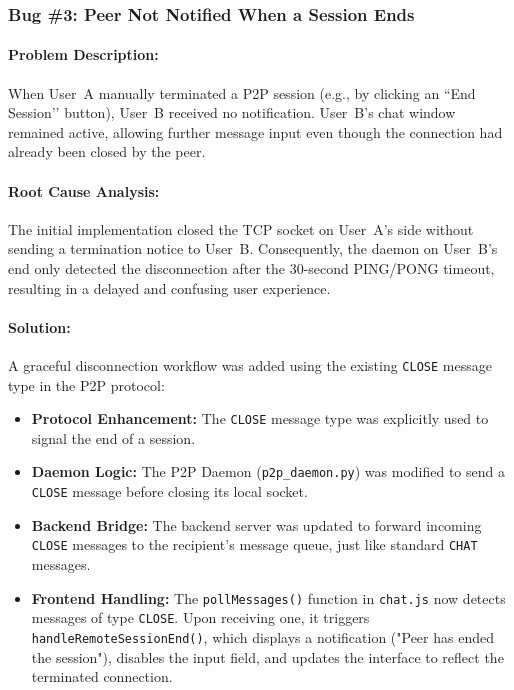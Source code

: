 \subsubsection{Bug \#3: Peer Not Notified When a Session Ends}

\paragraph{Problem Description:}
When User~A manually terminated a P2P session (e.g., by clicking an ``End Session’’ button), 
User~B received no notification. 
User~B’s chat window remained active, allowing further message input even though the connection had already been closed by the peer.

\paragraph{Root Cause Analysis:}
The initial implementation closed the TCP socket on User~A’s side without sending a termination notice to User~B. 
Consequently, the daemon on User~B’s end only detected the disconnection after the 30-second PING/PONG timeout, 
resulting in a delayed and confusing user experience.

\paragraph{Solution:}
A graceful disconnection workflow was added using the existing \texttt{CLOSE} message type in the P2P protocol:
\begin{itemize}
    \item \textbf{Protocol Enhancement:} The \texttt{CLOSE} message type was explicitly used to signal the end of a session.
    \item \textbf{Daemon Logic:} The P2P Daemon (\texttt{p2p\_daemon.py}) was modified to send a \texttt{CLOSE} message before closing its local socket.
    \item \textbf{Backend Bridge:} The backend server was updated to forward incoming \texttt{CLOSE} messages to the recipient’s message queue, just like standard \texttt{CHAT} messages.
    \item \textbf{Frontend Handling:} The \texttt{pollMessages()} function in \texttt{chat.js} now detects messages of type \texttt{CLOSE}. 
    Upon receiving one, it triggers \texttt{handleRemoteSessionEnd()}, which displays a notification ("Peer has ended the session"), disables the input field, and updates the interface to reflect the terminated connection.
\end{itemize}

